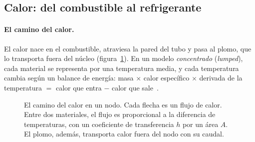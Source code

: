 \subsection{Calor: del combustible al refrigerante}
\paragraph{El camino del calor.} El calor nace en el combustible, atraviesa la pared del tubo y
pasa al plomo, que lo transporta fuera del núcleo (figura~\ref{fig:calor}). En un modelo
\emph{concentrado} (\emph{lumped}), cada material se representa por una temperatura media, y
cada temperatura cambia según un balance de energía: masa $\times$ calor específico $\times$
derivada de la temperatura $=$ calor que entra $-$ calor que sale~\cite{incropera2007,todreas2011}.

\begin{figure}[H]\centering
{}
\caption{El camino del calor en un nodo. Cada flecha es un flujo de calor. Entre dos
materiales, el flujo es proporcional a la diferencia de temperaturas, con un coeficiente de
transferencia $h$ por un área $A$. El plomo, además, transporta calor fuera del nodo con su
caudal.}
\label{fig:calor}
\end{figure}

